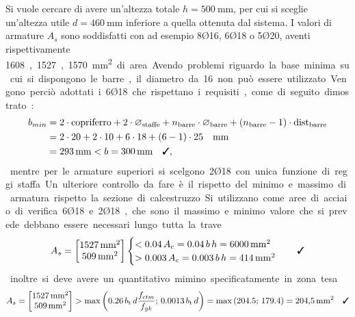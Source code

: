 Si vuole cercare di avere un'altezza totale $h = \SI{500}{\milli\metre}$, per cui si sceglie un'altezza utile $d = \SI{460}{\milli\metre}$ inferiore a quella ottenuta dal sistema. 
I valori di armature $A_s$ sono soddisfatti con ad esempio 8Ø16, 6Ø18 o 5Ø20, aventi rispettivamente \SI{1608}, \SI{1527}, \SI{1570}{\milli\metre\squared} di area.
Avendo problemi riguardo la base minima su cui si dispongono le barre, il diametro da 16 non può essere utilizzato. 
Vengono perciò adottati i 6Ø18 che rispettano i requisiti, come di seguito dimostrato:
\begin{equation}  
  \begin{split}
    b_{min} &= 2 \cdot \text{copriferro} + 2 \cdot \varnothing_\textup{staffe} + n_\textup{barre} \cdot \varnothing_\textup{barre} + \left( n_\textup{barre} - 1 \right) \cdot \text{dist}_\textup{barre}  \\
    &= 2 \cdot 20 + 2 \cdot 10 + 6 \cdot 18 + \left( 6 - 1 \right) \cdot 25 \quad \si{\milli\metre}\\
    &= \SI{293}{\milli\metre} < b = \SI{300}{\milli\metre} \quad \checked ,
  \end{split}
\end{equation}
mentre per le armature superiori si scelgono 2Ø18 con unica funzione di reggi staffa.

Un ulteriore controllo da fare è il rispetto del minimo e massimo di armatura rispetto la sezione di calcestruzzo.
Si utilizzano come aree di acciaio di verifica 6Ø18 e 2Ø18, che sono il massimo e minimo valore che si prevede debbano essere necessari lungo tutta la trave.
\begin{equation}
  A_s =
  \begin{bmatrix}
    \SI{1527}{\milli\metre\squared} \\
    \SI{509}{\milli\metre\squared}
  \end{bmatrix}
  \begin{cases}
    < 0.04 \, A_c = 0.04 \, b \, h = \SI{6000}{\milli\metre\squared} \\
    > 0.003 \, A_c = 0.003 \, b \, h = \SI{414}{\milli\metre\squared}
  \end{cases}
  \quad \checked
\end{equation}
inoltre si deve avere un quantitativo mimino specificatamente in zona tesa
\begin{equation}
  A_s =
  \begin{bmatrix}
    \SI{1527}{\milli\metre\squared} \\
    \SI{509}{\milli\metre\squared}
  \end{bmatrix}
  > \max\left(0.26 \, b_\textup{t} \, d \frac{f_{ctm}}{f_{yk}}; \, 0.0013 \, b_\textup{t} \, d\right) = \max\left(204.5; \, 179.4\right) = \SI{204.5}{\milli\metre\squared}
  \quad \checked
\end{equation}
